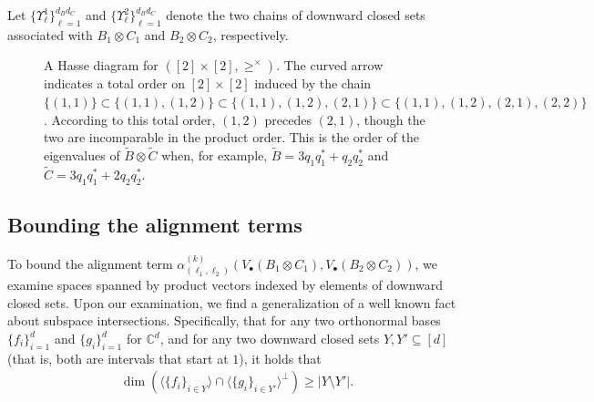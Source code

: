 \documentclass[12pt]{article}
\theoremstyle{definition}
\numberwithin{equation}{section}
\numberwithin{equation}{section}
\newcommand{\al}{\alpha}
\newcommand{\Ups}{\Upsilon}
\newcommand{\bC}{\mathbb{C}}
\begin{document}
Let \(\{ \Ups^{1}_{\ell} \}_{\ell=1}^{d_B d_C}\) and \(\{ \Ups^{2}_{\ell} \}_{\ell=1}^{d_B d_C}\) denote the two chains of downward closed sets associated with \(B_1 \otimes C_1\) and \(B_2 \otimes C_2\), respectively.


\begin{figure}[t]
\centering
{}
\caption{{A Hasse diagram for \(([2] \times [2], \geq^\times)\). The curved arrow indicates a total order on \([2] \times [2]\) induced by the chain \(\{(1,1)\} \subset \{(1,1), (1,2)\} \subset \{(1,1),(1,2),(2,1)\} \subset \{(1,1), (1,2),(2,1),(2,2)\}\). According to this total order, \((1,2)\) precedes \((2,1)\), though the two are incomparable in the product order. This is the order of the eigenvalues of \(\tilde{B} \otimes \tilde{C}\) when, for example, \(\tilde{B} = 3 q_1 q_1^* + q_2 q_2^*\) and \(\tilde{C} = 3 q_1 q_1^* + 2 q_2 q_2^*\).}}
\label{fig: Hasse diagram for 2by2}
\end{figure}



\subsection{Bounding the alignment terms} 
\label{subsec: bounding alignment}
 

To bound the alignment term \(\al_{(\ell_1, \ell_2)}^{(k)} (V_\bullet (B_1 \otimes C_1), V_
\bullet(B_2 \otimes C_2))\), we examine spaces spanned by product vectors indexed by elements of downward closed sets. Upon our examination, we find a generalization of a well known fact about subspace intersections. Specifically, that for any two orthonormal bases \(\{f_i\}_{i=1}^d\) and \(\{g_i\}_{i=1}^d\) for \(\bC^d\), and for any two downward closed sets \(Y, Y' \subseteq [d]\) (that is, both are intervals that start at \(1\)), it holds that 
\begin{align}
\label{eq: dim inequality for line}
\dim ( \langle \{ f_i\}_{i \in Y} \rangle \cap \langle \{g_i\}_{i \in Y'} \rangle^{\perp}) \geq | Y \setminus Y'|.
\end{align}
\end{document}
